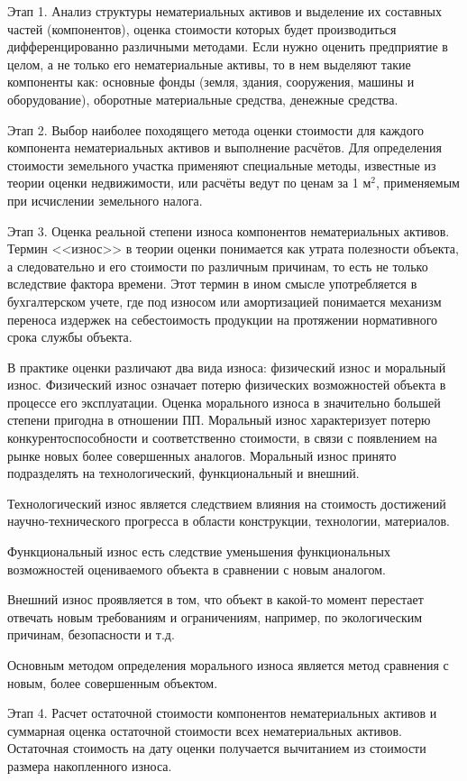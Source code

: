 Этап 1. Анализ структуры нематериальных активов и выделение их составных частей (компонентов), оценка стоимости которых будет производиться дифференцированно различными методами. Если нужно оценить предприятие в целом, а не только его нематериальные активы, то в нем выделяют такие компоненты как: основные фонды (земля, здания, сооружения, машины и оборудование), оборотные материальные средства, денежные средства. 

Этап 2. Выбор наиболее походящего метода оценки стоимости для каждого компонента нематериальных активов и выполнение расчётов. Для определения стоимости земельного участка применяют специальные методы, известные из теории оценки недвижимости, или расчёты ведут по ценам за 1 $м^2$, применяемым при исчислении земельного налога. 

Этап 3. Оценка реальной степени износа компонентов нематериальных активов. Термин <<износ>> в теории оценки понимается как утрата полезности объекта, а следовательно и его стоимости по различным причинам, то есть не только вследствие фактора времени. Этот термин в ином смысле употребляется в бухгалтерском учете, где под износом или амортизацией понимается механизм переноса издержек на себестоимость продукции на протяжении нормативного срока службы объекта. 

В практике оценки различают два вида износа: физический износ и моральный износ. Физический износ означает потерю физических возможностей объекта в процессе его эксплуатации. Оценка морального износа в значительно большей степени пригодна в отношении ПП. Моральный износ характеризует потерю конкурентоспособности и соответственно стоимости, в связи с появлением на рынке новых более совершенных аналогов. Моральный износ принято подразделять на технологический, функциональный и внешний.

Технологический износ является следствием влияния на стоимость достижений научно-технического прогресса в области конструкции, технологии, материалов. 

Функциональный износ есть следствие уменьшения функциональных возможностей оцениваемого объекта в сравнении с новым аналогом. 

Внешний износ проявляется в том, что объект в какой-то момент перестает отвечать новым требованиям и ограничениям, например, по экологическим причинам, безопасности и т.д. 

Основным методом определения морального износа является метод сравнения с новым, более совершенным объектом. 

Этап 4. Расчет остаточной стоимости компонентов нематериальных активов и суммарная оценка остаточной стоимости всех нематериальных активов. Остаточная стоимость на дату оценки получается вычитанием из стоимости размера накопленного износа. 

